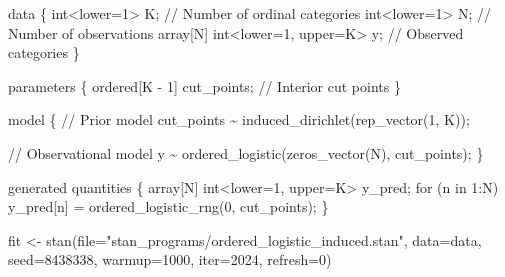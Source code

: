 \documentclass[
  letterpaper,
  DIV=11,
  numbers=noendperiod]{scrartcl}
\newenvironment{Shaded}{\begin{snugshade}}{\end{snugshade}}
\newcommand{\AttributeTok}[1]{\textcolor[rgb]{0.40,0.45,0.13}{#1}}
\newcommand{\CommentTok}[1]{\textcolor[rgb]{0.37,0.37,0.37}{#1}}
\newcommand{\ControlFlowTok}[1]{\textcolor[rgb]{0.00,0.23,0.31}{#1}}
\newcommand{\DataTypeTok}[1]{\textcolor[rgb]{0.68,0.00,0.00}{#1}}
\newcommand{\DecValTok}[1]{\textcolor[rgb]{0.68,0.00,0.00}{#1}}
\newcommand{\FunctionTok}[1]{\textcolor[rgb]{0.28,0.35,0.67}{#1}}
\newcommand{\KeywordTok}[1]{\textcolor[rgb]{0.00,0.23,0.31}{#1}}
\newcommand{\NormalTok}[1]{\textcolor[rgb]{0.00,0.23,0.31}{#1}}
\newcommand{\OtherTok}[1]{\textcolor[rgb]{0.00,0.23,0.31}{#1}}
\newcommand{\StringTok}[1]{\textcolor[rgb]{0.13,0.47,0.30}{#1}}
\begin{document}
\begin{codelisting}
\begin{Shaded}
\begin{Highlighting}[]
\KeywordTok{data}\NormalTok{ \{}
  \DataTypeTok{int}\NormalTok{\textless{}}\KeywordTok{lower}\NormalTok{=}\DecValTok{1}\NormalTok{\textgreater{} K;                   }\CommentTok{// Number of ordinal categories}
  \DataTypeTok{int}\NormalTok{\textless{}}\KeywordTok{lower}\NormalTok{=}\DecValTok{1}\NormalTok{\textgreater{} N;                   }\CommentTok{// Number of observations}
  \DataTypeTok{array}\NormalTok{[N] }\DataTypeTok{int}\NormalTok{\textless{}}\KeywordTok{lower}\NormalTok{=}\DecValTok{1}\NormalTok{, }\KeywordTok{upper}\NormalTok{=K\textgreater{} y; }\CommentTok{// Observed categories}
\NormalTok{\}}

\KeywordTok{parameters}\NormalTok{ \{}
  \DataTypeTok{ordered}\NormalTok{[K {-} }\DecValTok{1}\NormalTok{] cut\_points; }\CommentTok{// Interior cut points}
\NormalTok{\}}

\KeywordTok{model}\NormalTok{ \{}
  \CommentTok{// Prior model}
\NormalTok{  cut\_points \textasciitilde{} induced\_dirichlet(rep\_vector(}\DecValTok{1}\NormalTok{, K));}

  \CommentTok{// Observational model}
\NormalTok{  y \textasciitilde{} ordered\_logistic(zeros\_vector(N), cut\_points);}
\NormalTok{\}}

\KeywordTok{generated quantities}\NormalTok{ \{}
  \DataTypeTok{array}\NormalTok{[N] }\DataTypeTok{int}\NormalTok{\textless{}}\KeywordTok{lower}\NormalTok{=}\DecValTok{1}\NormalTok{, }\KeywordTok{upper}\NormalTok{=K\textgreater{} y\_pred;}
  \ControlFlowTok{for}\NormalTok{ (n }\ControlFlowTok{in} \DecValTok{1}\NormalTok{:N)}
\NormalTok{    y\_pred[n] = ordered\_logistic\_rng(}\DecValTok{0}\NormalTok{, cut\_points);}
\NormalTok{\}}
\end{Highlighting}
\end{Shaded}

\end{codelisting}

\begin{Shaded}
\begin{Highlighting}[]
\NormalTok{fit }\OtherTok{\textless{}{-}} \FunctionTok{stan}\NormalTok{(}\AttributeTok{file=}\StringTok{"stan\_programs/ordered\_logistic\_induced.stan"}\NormalTok{,}
            \AttributeTok{data=}\NormalTok{data, }\AttributeTok{seed=}\DecValTok{8438338}\NormalTok{,}
            \AttributeTok{warmup=}\DecValTok{1000}\NormalTok{, }\AttributeTok{iter=}\DecValTok{2024}\NormalTok{, }\AttributeTok{refresh=}\DecValTok{0}\NormalTok{)}
\end{Highlighting}
\end{Shaded}
\end{document}
